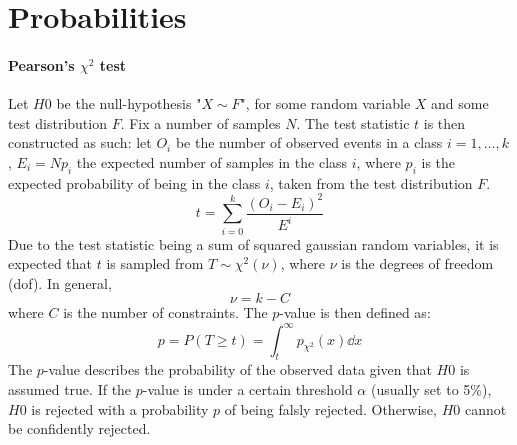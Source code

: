 \section{Probabilities}
\label{sec:pearson}

\paragraph{Pearson's \(\chi^2\) test}
Let \(H0\) be the null-hypothesis "\(X \sim F\)", for some random variable \(X\) and some test distribution \(F\). Fix a number of samples \(N\).
The test statistic \(t\) is then constructed as such: let \(O_i\) be the number of observed events in a class \(i=1,\dots,k\), \(E_i = Np_i\) the expected number of samples in the class \(i\), where \(p_i\) is the expected probability of being in the class \(i\), taken from the test distribution \(F\).
\begin{equation}
    t = \sum_{i=0}^k \frac{(O_i - E_i)^2}{E^i}
\end{equation}
Due to the test statistic being a sum of squared gaussian random variables, it is expected that \(t\) is sampled from \(T \sim \chi^2(\nu)\), where \(\nu\) is the degrees of freedom (dof). In general,
\begin{equation}
    \nu = k-C
\end{equation} 
where \(C\) is the number of constraints. The \(p\)-value is then defined as:
\begin{equation}
    p = P(T \ge t) = \int_t^\infty p_{\chi^2}(x) \dd x
\end{equation}
The \(p\)-value describes the probability of the observed data given that \(H0\) is assumed true. If the \(p\)-value is under a certain threshold \(\alpha\) (usually set to 5\%), \(H0\) is rejected with a probability \(p\) of being falsly rejected. Otherwise, \(H0\) cannot be confidently rejected.